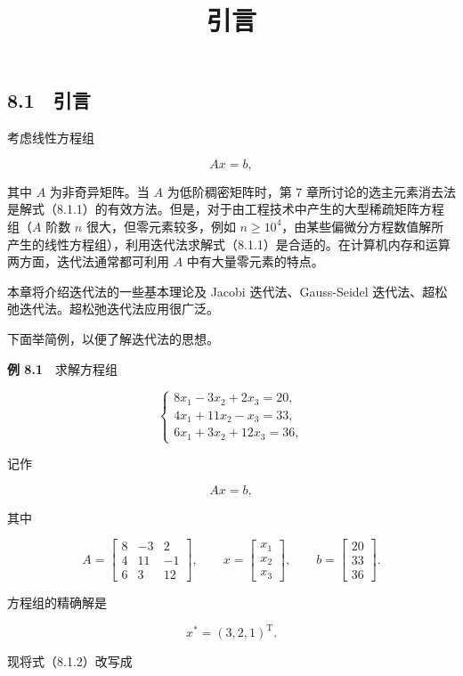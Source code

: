 \documentclass[
  10pt,
  fontset=fandol]{ctexart}
\title{引言}
\author{}
\date{}
\begin{document}
\maketitle

\subsection{8.1　引言}\label{ux5f15ux8a00}

考虑线性方程组

\[
Ax=b,
\tag{8.1.1}
\]

其中 \(A\) 为非奇异矩阵。当 \(A\) 为低阶稠密矩阵时，第 7 章所讨论的选主元素消去法是解式（8.1.1）的有效方法。但是，对于由工程技术中产生的大型稀疏矩阵方程组（\(A\) 阶数 \(n\) 很大，但零元素较多，例如 \(n\geqslant10^4\)，由某些偏微分方程数值解所产生的线性方程组），利用迭代法求解式（8.1.1）是合适的。在计算机内存和运算两方面，迭代法通常都可利用 \(A\) 中有大量零元素的特点。

本章将介绍迭代法的一些基本理论及 Jacobi 迭代法、Gauss-Seidel 迭代法、超松弛迭代法。超松弛迭代法应用很广泛。

下面举简例，以便了解迭代法的思想。

\textbf{例 8.1}　求解方程组

\[
\begin{cases}
8x_1-3x_2+2x_3=20,\\
4x_1+11x_2-x_3=33,\\
6x_1+3x_2+12x_3=36,
\end{cases}
\tag{8.1.2}
\]

记作

\[
Ax=b,
\]

其中

\[
A=\begin{bmatrix}8&-3&2\\4&11&-1\\6&3&12\end{bmatrix},\qquad
x=\begin{bmatrix}x_1\\x_2\\x_3\end{bmatrix},\qquad
b=\begin{bmatrix}20\\33\\36\end{bmatrix}.
\]

方程组的精确解是

\[
x^*=(3,2,1)^{\mathrm T}.
\]

现将式（8.1.2）改写成
\end{document}
